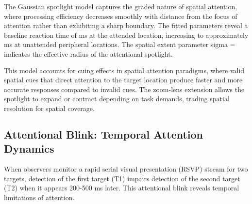 \documentclass[a4paper, 11pt]{article}
\begin{document}
The Gaussian spotlight model captures the graded nature of spatial attention, where processing efficiency decreases smoothly with distance from the focus of attention rather than exhibiting a sharp boundary. The fitted parameters reveal a baseline reaction time of  ms at the attended location, increasing to approximately  ms at unattended peripheral locations. The spatial extent parameter sigma =  indicates the effective radius of the attentional spotlight.

This model accounts for cuing effects in spatial attention paradigms, where valid spatial cues that direct attention to the target location produce faster and more accurate responses compared to invalid cues. The zoom-lens extension allows the spotlight to expand or contract depending on task demands, trading spatial resolution for spatial coverage.

\subsection{Attentional Blink: Temporal Attention Dynamics}

When observers monitor a rapid serial visual presentation (RSVP) stream for two targets, detection of the first target (T1) impairs detection of the second target (T2) when it appears 200-500 ms later. This attentional blink reveals temporal limitations of attention.
\end{document}
